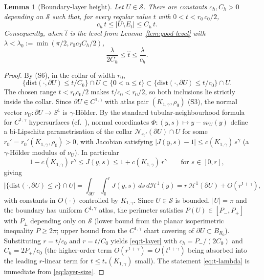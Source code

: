 \documentclass[11pt]{amsart}
\newtheorem{lemma}[theorem]{Lemma}
\newcommand{\HH}{\mathcal H}
\newcommand{\Sclass}{\mathcal S}
\begin{document}
\begin{lemma}[Boundary-layer height]\label{lem:height}
Let \(U\in\Sclass\).  There are constants \(c_h,C_h>0\) depending on
\(\Sclass\) such that, for every regular value \(t\) with
\(0<t<r_0\,c_0/2\),
\begin{equation}\label{eq:t-layer}
   c_h\,t\le |U\setminus E_t|\le C_h\,t.
\end{equation}
Consequently, when \(\hat t\) is the level from
Lemma~\ref{lem:good-level} with \(\lambda<\lambda_0:=
\min(\pi/2,r_0 c_0 C_h/2)\),
\begin{equation}\label{eq:t-lambda}
   \frac{\lambda}{2C_h}\le \hat t\le \frac{\lambda}{c_h}.
\end{equation}
\end{lemma}

\begin{proof}
By (S6), in the collar of width $r_0$,
\[
   \{\mathrm{dist}(\cdot,\partial U)\le t/C_0\}\cap U
      \subset
   \{0<u\le t\}
      \subset
   \{\mathrm{dist}(\cdot,\partial U)\le t/c_0\}\cap U.
\]
The chosen range $t<r_0c_0/2$ makes $t/c_0<r_0/2$, so both
inclusions lie strictly inside the collar.  Since $\partial U\in
C^{1,\gamma}$ with atlas pair $(K_{1,\gamma},\rho_0)$ (S3), the
normal vector $\nu_U:\partial U\to S^1$ is $\gamma$-Hölder.  By the
standard tubular-neighbourhood formula for $C^{1,\gamma}$
hypersurfaces \textup{(}cf.\ \cite[Theorem~3.1]{HP}\textup{)}, normal
coordinates $\Phi:(y,s)\mapsto y-s\nu_U(y)$ define a bi-Lipschitz
parametrisation of the collar
$\mathcal N_{r_0'}(\partial U)\cap U$ for some
$r_0'=r_0'(K_{1,\gamma},\rho_0)>0$, with Jacobian satisfying
$|J(y,s)-1|\le c(K_{1,\gamma})\,s^\gamma$ (a $\gamma$-Hölder
modulus of $\nu_U$).  In particular
\[
   1-c(K_{1,\gamma})\,r^\gamma\le J(y,s)\le 1+c(K_{1,\gamma})\,r^\gamma
   \qquad\text{for }s\in[0,r],
\]
giving
\[
   |\{\mathrm{dist}(\cdot,\partial U)\le r\}\cap U|
      =\int_{\partial U}\int_0^r J(y,s)\,ds\,d\HH^1(y)
      =r\,\HH^1(\partial U)+O(r^{1+\gamma}),
\]
with constants in $O(\cdot)$ controlled by $K_{1,\gamma}$.  Since
$U\in\Sclass$ is bounded, $|U|=\pi$ and the boundary has uniform
$C^{1,\gamma}$ atlas, the perimeter satisfies $P(U)\in[P_-,P_+]$ with
$P_\pm$ depending only on $\Sclass$ (lower bound from the planar
isoperimetric inequality $P\ge 2\pi$; upper bound from the
$C^{1,\gamma}$ chart covering of $\partial U\subset B_{R_0}$).
Substituting $r=t/c_0$ and $r=t/C_0$ yields \eqref{eq:t-layer} with
$c_h=P_-/(2C_0)$ and $C_h=2P_+/c_0$ (the higher-order term
$O(r^{1+\gamma})=O(t^{1+\gamma})$ being absorbed into the leading
$r$-linear term for $t\le t_*(K_{1,\gamma})$ small).  The statement
\eqref{eq:t-lambda} is immediate from \eqref{eq:layer-size}.
\end{proof}
\end{document}

